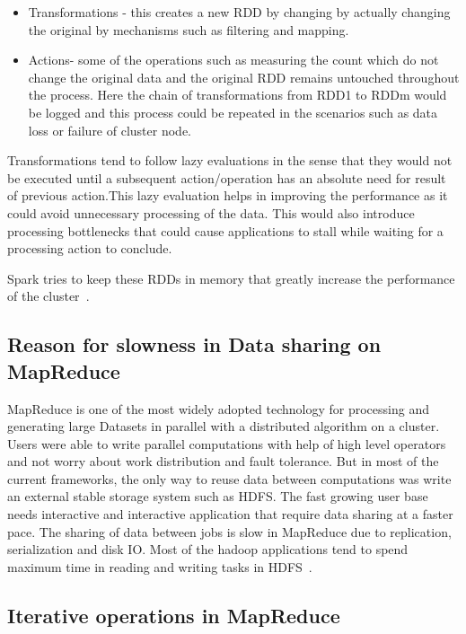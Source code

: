 \begin{itemize}

\item Transformations - this creates a new RDD by changing by actually changing the 
original by mechanisms such as filtering and mapping.

\item Actions- some of the operations such as measuring the count which do not change 
the original data and the original RDD remains untouched throughout the process.
 Here the chain of transformations from RDD1 to RDDm would be logged and this 
 process could be repeated in the scenarios such as data loss or failure of 
 cluster node.

\end{itemize}

 Transformations tend to follow lazy evaluations in the sense that they would 
not be executed until a subsequent action/operation has an absolute need for 
result of previous action.This lazy evaluation helps in improving the 
performance as it could avoid unnecessary processing of the data. This would 
also introduce processing bottlenecks that could cause applications to stall 
while waiting for a processing action to conclude.

Spark tries to keep these RDDs in memory that greatly increase the performance 
of the cluster~\cite{hid-sp18-410-spark-RDD}.

\subsection{Reason for slowness in Data sharing on MapReduce}

MapReduce is one of the most widely adopted technology  for processing and 
generating large Datasets in parallel with a distributed algorithm on a cluster.
 Users were able to write parallel computations with help of high level 
 operators and not worry about work distribution and fault tolerance. But in 
 most of the current frameworks, the only way to reuse data between 
 computations was write an external stable storage system such as HDFS. 
The fast growing user base needs interactive and interactive application that 
require data sharing at a faster pace. The sharing of data between jobs is slow 
in MapReduce due to replication, serialization and disk IO. Most of the hadoop 
applications tend to spend maximum time in reading and writing tasks in HDFS~\cite{hid-sp18-410-spark-RDD}.

\subsection{Iterative operations in MapReduce}

